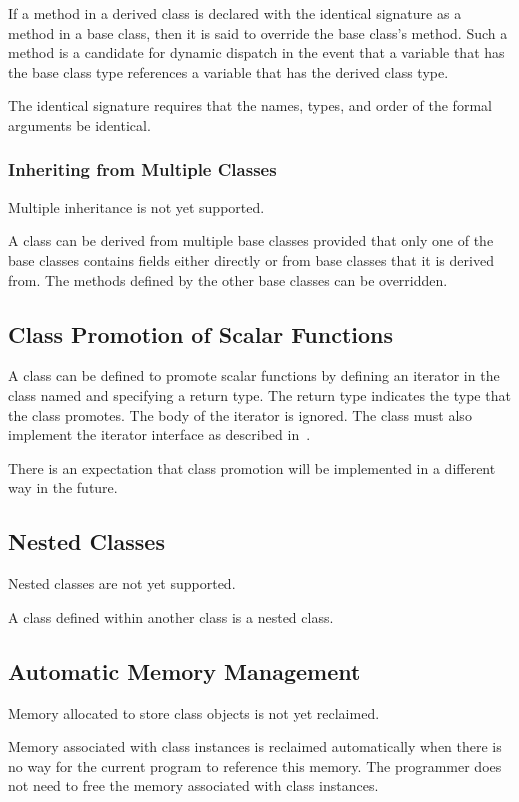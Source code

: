 If a method in a derived class is declared with the identical
signature as a method in a base class, then it is said to override the
base class's method.  Such a method is a candidate for dynamic
dispatch in the event that a variable that has the base class type
references a variable that has the derived class type.

The identical signature requires that the names, types, and order of
the formal arguments be identical.

\subsubsection{Inheriting from Multiple Classes}
\label{Inheriting_from_Multiple_Classes}

\begin{implementation}
Multiple inheritance is not yet supported.
\end{implementation}

A class can be derived from multiple base classes provided that only
one of the base classes contains fields either directly or from base
classes that it is derived from.  The methods defined by the other
base classes can be overridden.

\subsection{Class Promotion of Scalar Functions}
\label{Scalar Promotion}

A class can be defined to promote scalar functions by defining an
iterator in the class named  and specifying a return type.
The return type indicates the type that the class promotes.  The body
of the  iterator is ignored.  The class must also implement
the iterator interface as described in~.

There is an expectation that class promotion will be implemented in a
different way in the future.

\subsection{Nested Classes}
\label{Nested_Classes}

\begin{implementation}
Nested classes are not yet supported.
\end{implementation}

A class defined within another class is a nested class.

\subsection{Automatic Memory Management}
\label{Automatic_Memory_Management}

\begin{implementation}
Memory allocated to store class objects is not yet reclaimed.
\end{implementation}

Memory associated with class instances is reclaimed automatically when
there is no way for the current program to reference this memory.  The
programmer does not need to free the memory associated with class
instances.
